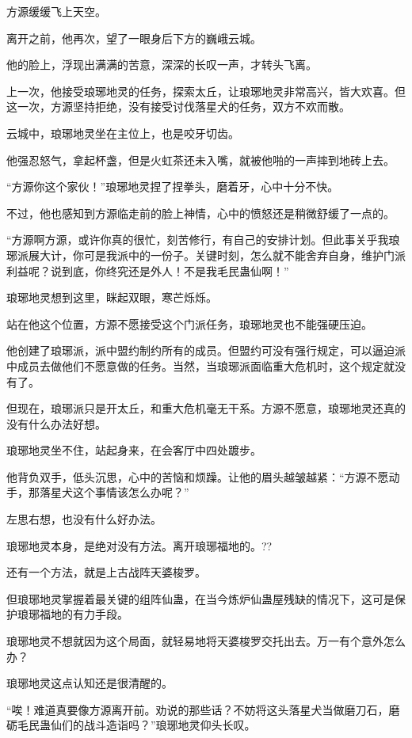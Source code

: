 
\begin{this_body}

方源缓缓飞上天空。

离开之前，他再次，望了一眼身后下方的巍峨云城。

他的脸上，浮现出满满的苦意，深深的长叹一声，才转头飞离。

上一次，他接受琅琊地灵的任务，探索太丘，让琅琊地灵非常高兴，皆大欢喜。但这一次，方源坚持拒绝，没有接受讨伐落星犬的任务，双方不欢而散。

云城中，琅琊地灵坐在主位上，也是咬牙切齿。

他强忍怒气，拿起杯盏，但是火虹茶还未入嘴，就被他啪的一声摔到地砖上去。

“方源你这个家伙！”琅琊地灵捏了捏拳头，磨着牙，心中十分不快。

不过，他也感知到方源临走前的脸上神情，心中的愤怒还是稍微舒缓了一点的。

“方源啊方源，或许你真的很忙，刻苦修行，有自己的安排计划。但此事关乎我琅琊派展大计，你可是我派中的一份子。关键时刻，怎么就不能舍弃自身，维护门派利益呢？说到底，你终究还是外人！不是我毛民蛊仙啊！”

琅琊地灵想到这里，眯起双眼，寒芒烁烁。

站在他这个位置，方源不愿接受这个门派任务，琅琊地灵也不能强硬压迫。

他创建了琅琊派，派中盟约制约所有的成员。但盟约可没有强行规定，可以逼迫派中成员去做他们不愿意做的任务。当然，当琅琊派面临重大危机时，这个规定就没有了。

但现在，琅琊派只是开太丘，和重大危机毫无干系。方源不愿意，琅琊地灵还真的没有什么办法好想。

琅琊地灵坐不住，站起身来，在会客厅中四处踱步。

他背负双手，低头沉思，心中的苦恼和烦躁。让他的眉头越皱越紧：“方源不愿动手，那落星犬这个事情该怎么办呢？”

左思右想，也没有什么好办法。

琅琊地灵本身，是绝对没有方法。离开琅琊福地的。??

还有一个方法，就是上古战阵天婆梭罗。

但琅琊地灵掌握着最关键的组阵仙蛊，在当今炼炉仙蛊屋残缺的情况下，这可是保护琅琊福地的有力手段。

琅琊地灵不想就因为这个局面，就轻易地将天婆梭罗交托出去。万一有个意外怎么办？

琅琊地灵这点认知还是很清醒的。

“唉！难道真要像方源离开前。劝说的那些话？不妨将这头落星犬当做磨刀石，磨砺毛民蛊仙们的战斗造诣吗？”琅琊地灵仰头长叹。


\end{this_body}
